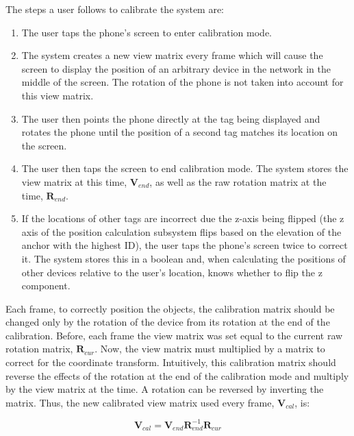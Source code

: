 The steps a user follows to calibrate the system are:
\begin{enumerate}
	\item The user taps the phone's screen to enter calibration mode.
	\item The system creates a new view matrix every frame which will cause the screen to display the position of an arbitrary device in the network in the middle of the screen. The rotation of the phone is not taken into account for this view matrix.
	\item The user then points the phone directly at the tag being displayed and rotates the phone until the position of a second tag matches its location on the screen.
	\item The user then taps the screen to end calibration mode. The system stores the view matrix at this time, $\mathbf{V}_{end}$, as well as the raw rotation matrix at the time, $\mathbf{R}_{end}$.
	\item If the locations of other tags are incorrect due the z-axis being flipped (the z axis of the position calculation subsystem flips based on the elevation of the anchor with the highest ID), the user taps the phone's screen twice to correct it. The system stores this in a boolean and, when calculating the positions of other devices relative to the user's location, knows whether to flip the z component.
\end{enumerate}

Each frame, to correctly position the objects, the calibration matrix should be changed only by the rotation of the device from its rotation at the end of the calibration. Before, each frame the view matrix was set equal to the current raw rotation matrix, $\mathbf{R}_{cur}$. Now, the view matrix must multiplied by a matrix to correct for the coordinate transform. Intuitively, this calibration matrix should reverse the effects of the rotation at the end of the calibration mode and multiply by the view matrix at the time. A rotation can be reversed by inverting the matrix. Thus, the new calibrated view matrix used every frame, $\mathbf{V}_{cal}$, is:

\[ 
	\mathbf{V}_{cal} = \mathbf{V}_{end} \mathbf{R}^{-1}_{end} \mathbf{R}_{cur}
\]

